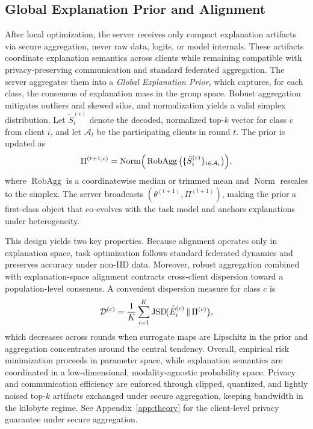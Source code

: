 \documentclass{article}
\theoremstyle{plain}
\theoremstyle{definition}
\theoremstyle{remark}
\begin{document}
\subsection{Global Explanation Prior and Alignment}

After local optimization, the server receives only compact explanation artifacts via secure aggregation, never raw data, logits, or model internals. These artifacts coordinate explanation semantics across clients while remaining compatible with privacy-preserving communication and standard federated aggregation. The server aggregates them into a \emph{Global Explanation Prior}, which captures, for each class, the consensus of explanation mass in the group space. Robust aggregation mitigates outliers and skewed silos, and normalization yields a valid simplex distribution. Let $\tilde{S}_i^{(c)}$ denote the decoded, normalized top-$k$ vector for class $c$ from client $i$, and let $\mathcal{A}_t$ be the participating clients in round $t$. The prior is updated as
\begin{equation}
\label{eq:prior-iclr}
{\small
\Pi^{(t+1,c)}
=\operatorname{Norm}\!\Big(
\operatorname{RobAgg}\big(\{\tilde{S}_i^{(c)}\}_{i\in\mathcal{A}_t}\big)
\Big),
}
\end{equation}
where $\operatorname{RobAgg}$ is a coordinatewise median or trimmed mean and $\operatorname{Norm}$ rescales to the simplex. The server broadcasts $(\theta^{(t+1)},\Pi^{(t+1)})$, making the prior a first-class object that co-evolves with the task model and anchors explanations under heterogeneity.

This design yields two key properties. Because alignment operates only in explanation space, task optimization follows standard federated dynamics and preserves accuracy under non-IID data. Moreover, robust aggregation combined with explanation-space alignment contracts cross-client dispersion toward a population-level consensus. A convenient dispersion measure for class $c$ is
\begin{equation}
\label{eq:disp-iclr2}
{\small
\mathcal{D}^{(c)}
=\frac{1}{K}\sum_{i=1}^{K}
\mathrm{JSD}\!\big(\tilde{\bar{E}}_i^{(c)}\,\|\,\Pi^{(c)}\big),
}
\end{equation}
which decreases across rounds when surrogate maps are Lipschitz in the prior and aggregation concentrates around the central tendency. Overall, empirical risk minimization proceeds in parameter space, while explanation semantics are coordinated in a low-dimensional, modality-agnostic probability space. Privacy and communication efficiency are enforced through clipped, quantized, and lightly noised top-$k$ artifacts exchanged under secure aggregation, keeping bandwidth in the kilobyte regime. See Appendix~\ref{app:theory} for the client-level privacy guarantee under secure aggregation.
\end{document}

